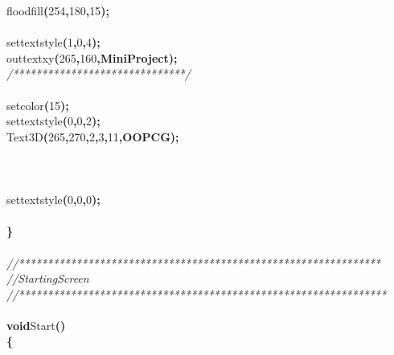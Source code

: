 \documentclass[a4paper, 10pt]{article}
\newcommand\SPC{\hspace*{0.6em}}
\newcommand\HYP{\mbox{\char 45}}
\newcommand\QOT{\mbox{\char 34}}
\newcommand{\CppAComment}[1]{\textit{\textcolor[rgb]{0.2,0.6,1}{#1}}}
\newcommand{\CppAIdentifier}[1]{#1}
\newcommand{\CppANumber}[1]{\textcolor[rgb]{0.5,0,0.5}{#1}}
\newcommand{\CppAReservedWord}[1]{\textbf{#1}}
\newcommand{\CppASpace}[1]{\colorbox[rgb]{1,1,1}{#1}}
\newcommand{\CppAString}[1]{\textbf{\textcolor[rgb]{0,0,1}{#1}}}
\newcommand{\CppASymbol}[1]{\textbf{\textcolor[rgb]{1,0,0}{#1}}}
\begin{document}
\begin{ttfamily}
\CppASpace{\SPC \SPC \SPC \SPC }\CppAIdentifier{floodfill}\CppASymbol{(}\CppANumber{254}\CppASymbol{,}\CppANumber{180}\CppASymbol{,}\CppANumber{15}\CppASymbol{)}\CppASymbol{;}\\
\\
\CppASpace{\SPC \SPC \SPC \SPC }\CppAIdentifier{settextstyle}\CppASymbol{(}\CppANumber{1}\CppASymbol{,}\CppANumber{0}\CppASymbol{,}\CppANumber{4}\CppASymbol{)}\CppASymbol{;}\\
\CppASpace{\SPC \SPC \SPC \SPC }\CppAIdentifier{outtextxy}\CppASymbol{(}\CppANumber{265}\CppASymbol{,}\CppANumber{160}\CppASymbol{,}\CppAString{\QOT MiniProject\QOT }\CppASymbol{)}\CppASymbol{;}\\
\CppASpace{\SPC \SPC }\CppAComment{/******************************/}\\
\\
\CppASpace{\SPC \SPC \SPC \SPC }\CppAIdentifier{setcolor}\CppASymbol{(}\CppANumber{15}\CppASymbol{)}\CppASymbol{;}\\
\CppASpace{\SPC \SPC \SPC \SPC }\CppAIdentifier{settextstyle}\CppASymbol{(}\CppANumber{0}\CppASymbol{,}\CppANumber{0}\CppASymbol{,}\CppANumber{2}\CppASymbol{)}\CppASymbol{;}\\
\CppASpace{\SPC \SPC \SPC \SPC }\CppAIdentifier{Text3D}\CppASymbol{(}\CppANumber{265}\CppASymbol{,}\CppANumber{270}\CppASymbol{,}\CppANumber{2}\CppASymbol{,}\CppANumber{3}\CppASymbol{,}\CppANumber{11}\CppASymbol{,}\CppAString{\QOT OOP\HYP CG\QOT }\CppASymbol{)}\CppASymbol{;}\\
\\
\\
\\
\CppASpace{\SPC \SPC \SPC \SPC }\CppAIdentifier{settextstyle}\CppASymbol{(}\CppANumber{0}\CppASymbol{,}\CppANumber{0}\CppASymbol{,}\CppANumber{0}\CppASymbol{)}\CppASymbol{;}\\
\\
\CppASymbol{\}}\\
\\
\CppAComment{//***************************************************************}\\
\CppAComment{//\SPC \SPC \SPC Starting\SPC Screen}\\
\CppAComment{//****************************************************************}\\
\\
\CppAReservedWord{void}\CppASpace{\SPC }\CppAIdentifier{Start}\CppASymbol{(}\CppASymbol{)}\\
\CppASymbol{\{}\\

\end{ttfamily}
\end{document}
